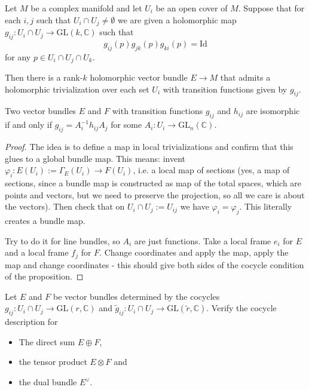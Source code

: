 \documentclass{book}
\begin{document}
\begin{proposition}
\label{proposition-vecto-bundl-cocyc}
Let $M$ be a complex manifold and let $U_i$
be an open cover of $M$.
Suppose that for each $i,j$ such that $U_i
\cap U_j \neq \emptyset$
we are given a holomorphic map $g_{ij}:U_i
\cap U_j \to \text{GL}(k,\mathbb{C})$
such that
$$
g_{ij}(p)g_{jk}(p)g_{ki}(p)=\text{Id}
$$
for any $p \in U_i\cap U_j\cap U_k$.

Then there is a rank-$k$ holomorphic vector
bundle $E \to M$
that admits a holomorphic trivialization over
each set $U_i$
with transition functions given by $g_{ij}$.
\end{proposition}

\begin{proposition}
\label{proposition-isomo-vecto-bundl}
\begin{reference}
\cite[Proposition 3.7]{lec}
\end{reference}
Two vector bundles $E$ and $F$
with transition functions $g_{ij}$ and
$h_{ij}$
are isomorphic if and only if
$g_{ij}=A^{-1}_ih_{ij}A_j$
for some $A_i:U_i \to
\text{GL}_n(\mathbb{C})$.
\end{proposition}

\begin{proof}
The idea is to define a map in local
trivializations
and confirm that this glues to a global
bundle map.
This means: invent
$\varphi_i:E(U_i):=\Gamma_E(U_i) \to F(U_i)$,
i.e. a local map of sections
(yes, a map of sections, since a bundle map
is constructed as map of the total spaces,
which are points and vectors,
but we need to preserve the projection,
so all we care is about the vectors).
Then check that on $U_i\cap U_j:= U_{ij}$
we have $\varphi_i=\varphi_j$.
This literally creates a bundle map.

Try to do it for line bundles,
so $A_i$ are just functions.
Take a local frame $e_i$ for $E$
and a local frame $f_j$ for $F$.
Change coordinates and apply the map,
apply the map and change coordinates
- this should give both sides of the cocycle
condition
of the proposition.
\end{proof}

\begin{exercise}
\label{exercise-tensor-product-bundle}
\begin{reference}
\cite[Exercise 2.2.1]{huc}
\end{reference}
Let $E$ and $F$ be vector bundles determined
by the cocycles
$g_{ij}: U_i \cap U_j \to
\text{GL}(r,\mathbb{C})$
and $\tilde{g}_{ij}:U_i \cap U_j \to
\text{GL}(\tilde{r},\mathbb{C})$.
Verify the cocycle description for
\begin{itemize}
\item The direct sum $E \oplus F$,
\item the tensor product $E \otimes F$ and
\item the dual bundle $E^\vee$.
\end{itemize}
\end{exercise}
\end{document}
